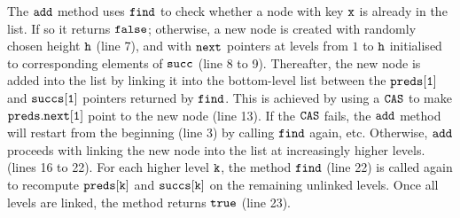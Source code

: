
The $\tt add$ method uses $\tt find$ to check whether a node with key $\tt x$ is already in the list. If so it returns $\tt false$; otherwise, a new node is created with randomly chosen height $\tt h$ (line 7), and with $\tt next$ pointers at levels from $1$ to $\tt h$  initialised to corresponding elements of $\tt succ$ (line 8 to 9). Thereafter, the new node is added into the list by linking it into the bottom-level list between the $\tt preds[1]$ and $\tt succs[1]$ pointers returned by $\tt find$. This is achieved by using a $\tt CAS$ to make $\tt preds.next[1]$ point to the new node (line 13). If the $\tt CAS$ fails, the $\tt add$ method will restart from the beginning (line 3) by calling $\tt find$ again, etc. Otherwise, $\tt add$ proceeds with linking the new node into the list at increasingly higher levels. (lines 16 to 22). For each higher level ${\tt k}$, the method $\tt find$ (line 22) is called again to recompute $\tt preds[k]$ and $\tt succs[k]$ on the remaining unlinked levels. Once all levels are linked, the method returns $\tt true$ (line 23).

 


